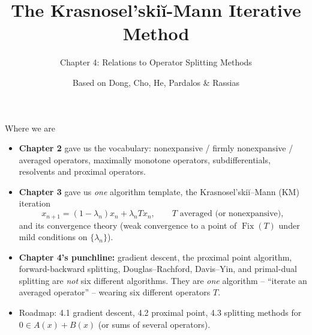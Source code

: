 \documentclass[aspectratio=169,10pt]{beamer}
\title[KM Method -- Ch.4]{The Krasnosel'ski\u{i}-Mann Iterative Method}
\subtitle{Chapter 4: Relations to Operator Splitting Methods}
\author{Based on Dong, Cho, He, Pardalos \& Rassias}
\date{}
\newcommand{\Fix}{\operatorname{Fix}}
\begin{document}
\begin{frame}
  \titlepage
\end{frame}

\begin{frame}{Where we are}
  \begin{itemize}
    \item \textbf{Chapter 2} gave us the vocabulary: nonexpansive / firmly nonexpansive / averaged operators, maximally monotone operators, subdifferentials, resolvents and proximal operators.
    \item \textbf{Chapter 3} gave us \emph{one} algorithm template, the Krasnosel'ski\u{i}--Mann (KM) iteration
    \[
      x_{n+1} = (1-\lambda_n)x_n + \lambda_n T x_n, \qquad T \text{ averaged (or nonexpansive)},
    \]
    and its convergence theory (weak convergence to a point of $\Fix(T)$ under mild conditions on $\{\lambda_n\}$).
    \item \textbf{Chapter 4's punchline:} gradient descent, the proximal point algorithm, forward-backward splitting, Douglas--Rachford, Davis--Yin, and primal-dual splitting are \emph{not} six different algorithms. They are \emph{one} algorithm -- ``iterate an averaged operator'' -- wearing six different operators $T$.
    \item Roadmap: 4.1 gradient descent, 4.2 proximal point, 4.3 splitting methods for $0\in A(x)+B(x)$ (or sums of several operators).
  \end{itemize}
\end{frame}
\end{document}
